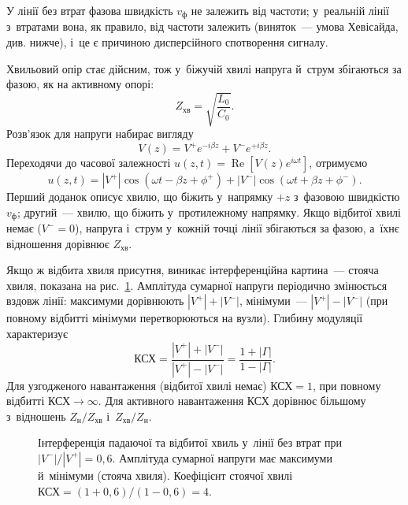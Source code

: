 У лінії без втрат фазова швидкість $v_{\text{ф}}$ не залежить від частоти; у~реальній лінії з~втратами вона, як правило, від частоти залежить (виняток~--- умова Хевісайда, див. нижче), і~це є причиною дисперсійного спотворення сигналу.

Хвильовий опір стає дійсним, тож у~біжучій хвилі напруга й~струм збігаються за фазою, як на активному опорі:
\begin{equation}\label{eq:char_impedance_lossless}
	Z_{\text{хв}} = \sqrt{\frac{L_0}{C_0}}.
\end{equation}
Розв'язок для напруги набирає вигляду
\begin{equation}\label{eq:voltage_lossless}
	V(z) = V^+ e^{-i\beta z} + V^- e^{+i\beta z}.
\end{equation}
Переходячи до часової залежності $u(z,t) = \operatorname{Re}[V(z)e^{i\omega t}]$, отримуємо
\begin{equation}\label{eq:voltage_time_lossless}
	u(z,t) = |V^+| \cos(\omega t - \beta z + \phi^+) + |V^-| \cos(\omega t + \beta z + \phi^-).
\end{equation}
Перший доданок описує хвилю, що біжить у~напрямку $+z$ з~фазовою швидкістю $v_{\text{ф}}$; другий~--- хвилю, що біжить у~протилежному напрямку. Якщо відбитої хвилі немає ($V^- = 0$), напруга і~струм у~кожній точці лінії збігаються за фазою, а~їхнє відношення дорівнює $Z_{\text{хв}}$.

Якщо ж відбита хвиля присутня, виникає інтерференційна картина~--- стояча хвиля, показана на рис.~\ref{fig:standing_wave}. Амплітуда сумарної напруги періодично змінюється вздовж лінії: максимуми дорівнюють $|V^+|+|V^-|$, мінімуми~--- $|V^+|-|V^-|$ (при повному відбитті мінімуми перетворюються на вузли). Глибину модуляції характеризує 
\begin{equation*}
	\text{КСХ} = \frac{|V^+|+|V^-|}{|V^+|-|V^-|} = \frac{1+|\Gamma|}{1-|\Gamma|}.
\end{equation*}
Для узгодженого навантаження (відбитої хвилі немає) $\text{КСХ}=1$, при повному відбитті $\text{КСХ}\to\infty$. Для активного навантаження $\text{КСХ}$ дорівнює більшому з~відношень $Z_{\text{н}}/Z_{\text{хв}}$ і~$Z_{\text{хв}}/Z_{\text{н}}$.
\begin{figure}[h!]
	\centering
	\caption{Інтерференція падаючої та відбитої хвиль у~лінії без втрат при $|V^-|/|V^+| = 0{,}6$. Амплітуда сумарної напруги має максимуми й~мінімуми (стояча хвиля). Коефіцієнт стоячої хвилі $\text{КСХ} = (1+0{,}6)/(1-0{,}6) = 4$.}
	\label{fig:standing_wave}
\end{figure}

